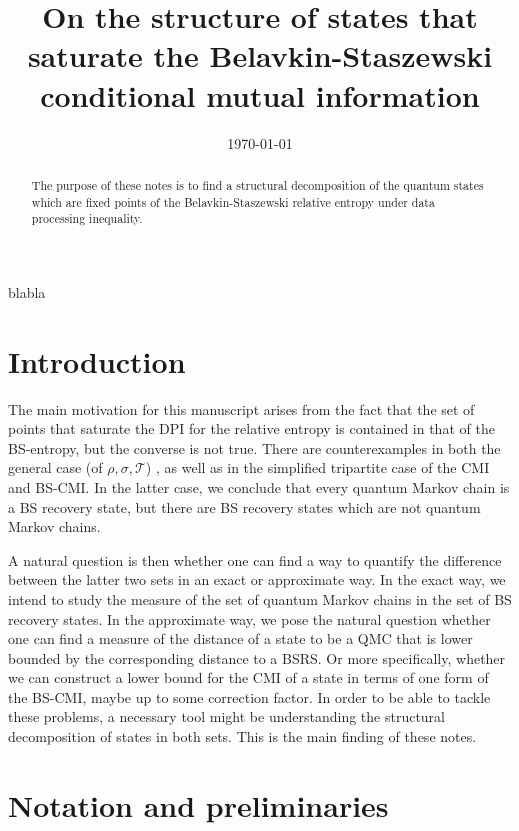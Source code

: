 \documentclass[11pt]{article}
\theoremstyle{newdefinition}
\theoremstyle{newplain}
\theoremstyle{myplain}
\DeclareMathOperator{\1}{\mathds{1}}
\newcommand{\AJ}[1]{{\color{magenta}#1}}
\begin{document}
\title{On the structure of states that saturate the Belavkin-Staszewski conditional mutual information}

\author{}

\date{\today}


\maketitle

\AJ{blabla}

\begin{abstract}
    The purpose of these notes is to find a structural decomposition of the quantum states which are fixed points of the Belavkin-Staszewski relative entropy under data processing inequality.
\end{abstract}


\section{Introduction}



The main motivation for this manuscript arises from the fact that the set of points that saturate the DPI for the relative entropy is contained in that of the BS-entropy, but the converse is not true. There are counterexamples in both the general case (of $\rho, \sigma, \mathcal{T}$) \cite{HiaiMosonyi-f-divergences-2017,Jencova2009}, as well as in the simplified tripartite case of the CMI and BS-CMI. In the latter case, we conclude that every quantum Markov chain is a BS recovery state, but there are BS recovery states which are not quantum Markov chains. 

A natural question is then whether one can find a way to quantify the difference between the latter two sets in an exact or approximate way. In the exact way, we intend to study the measure of the set of quantum Markov chains in the set of BS recovery states. In the approximate way, we pose the natural question whether one can find a measure of the distance of a state to be a QMC that is lower bounded by the corresponding distance to a BSRS. Or more specifically, whether we can construct a lower bound for the CMI of a state in terms of one form of the BS-CMI, maybe up to some correction factor. In order to be able to tackle these problems, a necessary tool might be understanding the structural decomposition of states in both sets. This is the main finding of these notes.



\section{Notation and preliminaries}
\end{document}

